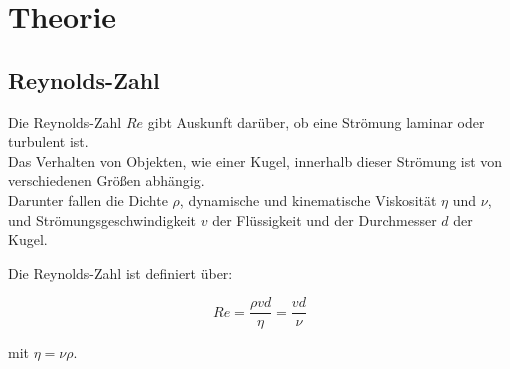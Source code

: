 \section{Theorie}
\label{sec:Theorie}

\subsection{Reynolds-Zahl}
\label{subsec:Reynolds-Zahl}

Die Reynolds-Zahl $Re$ gibt Auskunft darüber, ob eine Strömung laminar oder turbulent ist. \\
Das Verhalten von Objekten, wie einer Kugel, innerhalb dieser Strömung ist von verschiedenen Größen abhängig.\\
Darunter fallen die Dichte $\rho$, dynamische und kinematische Viskosität $\eta$ und $\nu$, 
und Strömungsgeschwindigkeit $v$ der Flüssigkeit 
und der Durchmesser $d$ der Kugel.

Die Reynolds-Zahl ist definiert über: 

\begin{equation}
    Re = \frac{\rho v d }{\eta} = \frac{v d }{\nu}
\end{equation}

mit $\eta = \nu \rho$.








\cite{sample}
